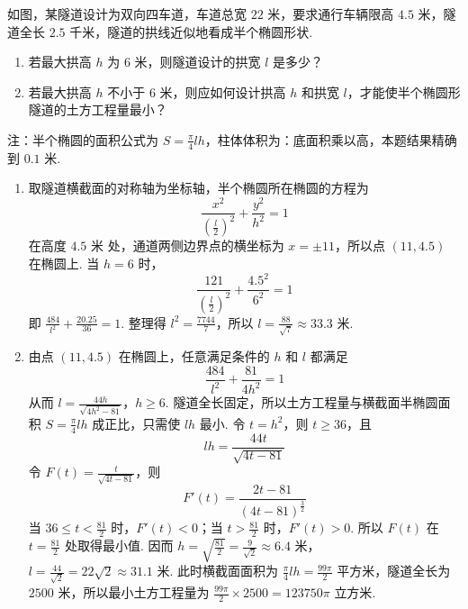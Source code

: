 \begin{problem}
如图，某隧道设计为双向四车道，车道总宽 \(22\text{ 米}\)，要求通行车辆限高 \(4.5\text{ 米}\)，隧道全长 \(2.5\text{ 千米}\)，隧道的拱线近似地看成半个椭圆形状.

\begin{enumerate}
\item 若最大拱高 \(h\) 为 \(6\text{ 米}\)，则隧道设计的拱宽 \(l\) 是多少？
\item 若最大拱高 \(h\) 不小于 \(6\text{ 米}\)，则应如何设计拱高 \(h\) 和拱宽 \(l\)，才能使半个椭圆形隧道的土方工程量最小？
\end{enumerate}

注：半个椭圆的面积公式为 \(S = \frac{\pi}{4} lh\)，柱体体积为：底面积乘以高，本题结果精确到 \(0.1\text{ 米}\).

\end{problem}

\begin{solution}
\begin{enumerate}
\item 取隧道横截面的对称轴为坐标轴，半个椭圆所在椭圆的方程为
\[
\frac{x^2}{(\frac{l}{2})^2}+\frac{y^2}{h^2}=1
\]
在高度 \(4.5\text{ 米}\) 处，通道两侧边界点的横坐标为 \(x=\pm11\)，所以点 \((11,4.5)\) 在椭圆上. 当 \(h=6\) 时，
\[
\frac{121}{(\frac{l}{2})^2}+\frac{4.5^2}{6^2}=1
\]
即 \(\frac{484}{l^2}+\frac{20.25}{36}=1\). 整理得 \(l^2=\frac{7744}{7}\)，所以 \(l=\frac{88}{\sqrt7}\approx33.3\text{ 米}\).
\item 由点 \((11,4.5)\) 在椭圆上，任意满足条件的 \(h\) 和 \(l\) 都满足
\[
\frac{484}{l^2}+\frac{81}{4h^2}=1
\]
从而
\(l=\frac{44h}{\sqrt{4h^2-81}}\)，\(h\geqslant6\).
隧道全长固定，所以土方工程量与横截面半椭圆面积 \(S=\frac{\pi}{4}lh\) 成正比，只需使 \(lh\) 最小. 令 \(t=h^2\)，则 \(t\geqslant36\)，且
\[
lh=\frac{44t}{\sqrt{4t-81}}
\]
令 \(F(t)=\frac{t}{\sqrt{4t-81}}\)，则
\[
F'(t)=\frac{2t-81}{(4t-81)^{\frac{3}{2}}}
\]
当 \(36\leqslant t<\frac{81}{2}\) 时，\(F'(t)<0\)；当 \(t>\frac{81}{2}\) 时，\(F'(t)>0\). 所以 \(F(t)\) 在 \(t=\frac{81}{2}\) 处取得最小值. 因而
\(h=\sqrt{\frac{81}{2}}=\frac{9}{\sqrt2}\approx6.4\text{ 米}\)，\(l=\frac{44}{\sqrt2}=22\sqrt2\approx31.1\text{ 米}\).
此时横截面面积为 \(\frac{\pi}{4}lh=\frac{99\pi}{2}\text{ 平方米}\)，隧道全长为 \(2500\text{ 米}\)，所以最小土方工程量为 \(\frac{99\pi}{2}\times2500=123750\pi\text{ 立方米}\).
\end{enumerate}
\end{solution}

